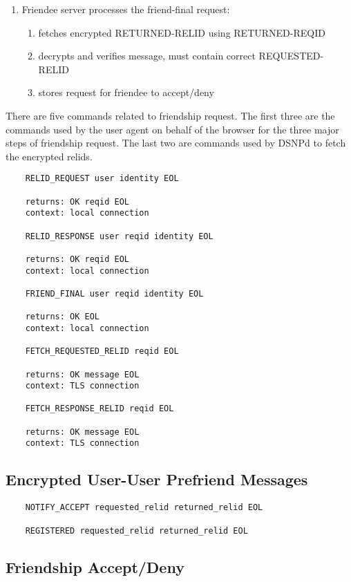 \documentclass[letterpaper,11pt,oneside]{article}
\begin{document}
\begin{enumerate}
\item Friendee server processes the friend-final request:
	\begin{enumerate}
	\item fetches encrypted RETURNED-RELID using RETURNED-REQID
	\item decrypts and verifies message, must contain correct REQUESTED-RELID
	\item stores request for friendee to accept/deny
	\end{enumerate}
\end{enumerate}

There are five commands related to friendship request. The first three are the
commands used by the user agent on behalf of the browser for the three major
steps of friendship request. The last two are commands used by DSNPd to fetch
the encrypted relids.

\vspace{10pt}
\begin{verbatim}
    RELID_REQUEST user identity EOL

    returns: OK reqid EOL
    context: local connection

    RELID_RESPONSE user reqid identity EOL

    returns: OK reqid EOL
    context: local connection

    FRIEND_FINAL user reqid identity EOL

    returns: OK EOL
    context: local connection

    FETCH_REQUESTED_RELID reqid EOL

    returns: OK message EOL
    context: TLS connection

    FETCH_RESPONSE_RELID reqid EOL

    returns: OK message EOL
    context: TLS connection
\end{verbatim}

\subsection{Encrypted User-User Prefriend Messages}

\vspace{10pt}
\begin{verbatim}
    NOTIFY_ACCEPT requested_relid returned_relid EOL

    REGISTERED requested_relid returned_relid EOL
\end{verbatim}

\subsection{Friendship Accept/Deny}
\end{document}
